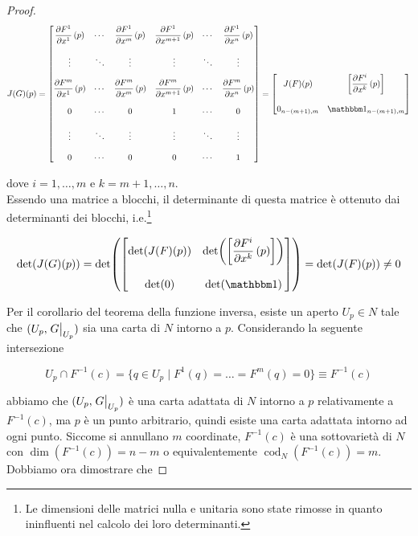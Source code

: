 \begin{proof}
	\begin{equation}
		J(G)(p) = %
		\bmqty{ %
			\dpdv{F^{1}}{x^{1}} \, (p) & \cdots & \dpdv{F^{1}}{x^{m}} \, (p) & \dpdv{F^{1}}{x^{m+1}} \, (p) & \cdots & \dpdv{F^{1}}{x^{n}} \, (p) \\\\ %
			\vdots & \ddots & \vdots & \vdots & \ddots & \vdots \\\\ %
			\dpdv{F^{m}}{x^{1}} \, (p) & \cdots & \dpdv{F^{m}}{x^{m}} \, (p) & \dpdv{F^{m}}{x^{m+1}} \, (p) & \cdots & \dpdv{F^{m}}{x^{n}} \, (p) \\\\ %
			0 & \cdots & 0 & 1 & \cdots & 0 \\\\ %
			\vdots & \ddots & \vdots & \vdots & \ddots & \vdots \\\\ %
			0 & \cdots & 0 & 0 & \cdots & 1 %
		 } %
	 	= \bmqty{ %
	 		J(F)(p) & \left[ \dpdv{F^{i}}{x^{k}} \, (p) \right] \\\\ %
	 		0_{n-(m+1),m} & \bigone_{n-(m+1),m} %
	 		}
	\end{equation}

	dove $ i=1,\dots,m $ e $ k=m+1,\dots,n $.\\
	Essendo una matrice a blocchi, il determinante di questa matrice è ottenuto dai determinanti dei blocchi, i.e.\footnote{%
		Le dimensioni delle matrici nulla e unitaria sono state rimosse in quanto ininfluenti nel calcolo dei loro determinanti.%
	}
	
	\begin{equation}
		\det(J(G)(p)) = %
		\det ( \bmqty{ %
			\det( J(F)(p) ) & \det( \left[ \dpdv{F^{i}}{x^{k}} \, (p) \right] ) \\\\ %
			\det( 0 ) & \det( \bigone ) %
			} ) %
		= \det( J(F)(p) ) \neq 0
	\end{equation}

	Per il corollario del teorema della funzione inversa, esiste un aperto $ U_{p} \in N $ tale che $ (U_{p},\eval{G}_{U_{p}}) $ sia una carta di $ N $ intorno a $ p $. Considerando la seguente intersezione
	
	\begin{equation}
		U_{p} \cap F^{-1}(c) = \{ q \in U_{p} \mid F^{1}(q) = \dots = F^{m}(q) = 0 \} \equiv F^{-1}(c)
	\end{equation}

	abbiamo che $ (U_{p},\eval{G}_{U_{p}}) $ è una carta adattata di $ N $ intorno a $ p $ relativamente a $ F^{-1}(c) $, ma $ p $ è un punto arbitrario, quindi esiste una carta adattata intorno ad ogni punto. Siccome si annullano $ m $ coordinate, $ F^{-1}(c) $ è una sottovarietà di $ N $ con $ \dim(F^{-1}(c)) = n-m $ o equivalentemente $ \operatorname{cod}_{N}(F^{-1}(c)) = m $.\\
	Dobbiamo ora dimostrare che
	

\end{proof}
